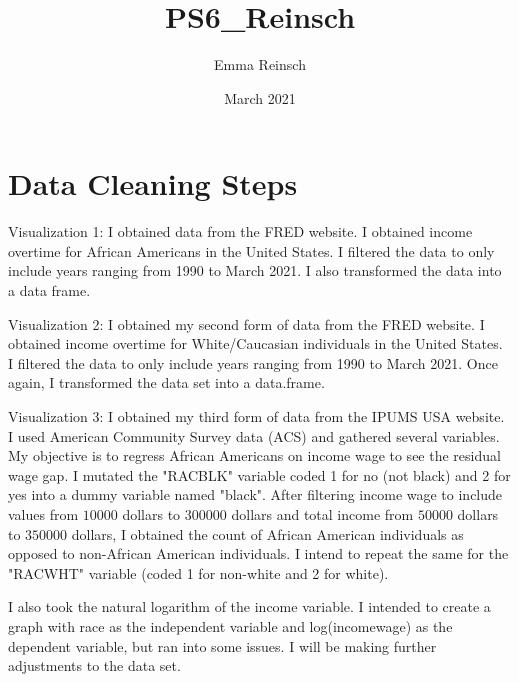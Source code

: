 \documentclass{article}
\title{PS6_Reinsch}
\author{Emma Reinsch}
\date{March 2021}
\begin{document}
\section{Data Cleaning Steps}
Visualization 1: I obtained data from the FRED website. I obtained income overtime for African Americans in the United States. I filtered the data to only include years ranging from 1990 to March 2021. I also transformed the data into a data frame.


Visualization 2: I obtained my second form of data from the FRED website. I obtained income overtime for White/Caucasian individuals in the United States. I filtered the data to only include years ranging from 1990 to March 2021. Once again, I transformed the data set into a data.frame.


Visualization 3: I obtained my third form of data from the IPUMS USA website. I used American Community Survey data (ACS) and gathered several variables. My objective is to regress African Americans on income wage to see the residual wage gap. I mutated the "RACBLK" variable coded 1 for no (not black) and 2 for yes into a dummy variable named "black". After filtering income wage to include values from $10000$ dollars to $300000$ dollars and total income from $50000$ dollars to $350000$ dollars, I obtained the count of African American individuals as opposed to non-African American individuals. I intend to repeat the same for the "RACWHT" variable (coded 1 for non-white and 2 for white). 

I also took the natural logarithm of the income variable. I intended to create a graph with race as the independent variable and log(incomewage) as the dependent variable, but ran into some issues. I will be making further adjustments to the data set.
\end{document}
